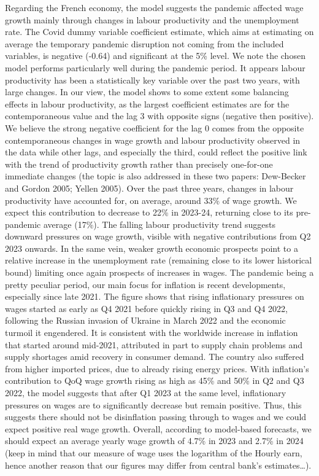 Regarding the French economy, the model suggests the pandemic affected wage growth mainly through changes in labour productivity and the unemployment rate. 
The Covid dummy variable coefficient estimate, which aims at estimating on average the temporary pandemic disruption not coming from the included variables, is negative (-0.64) and significant at the 5\% level. 
We note the chosen model performs particularly well during the pandemic period. 
It appears labour productivity has been a statistically key variable over the past two years, with large changes. 
In our view, the model shows to some extent some balancing effects in labour productivity, as the largest coefficient estimates are for the contemporaneous value and the lag 3 with opposite signs (negative then positive). 
We believe the strong negative coefficient for the lag 0 comes from the opposite contemporaneous changes in wage growth and labour productivity observed in the data while other lags, and especially the third, could reflect the positive link with the trend of productivity growth rather than precisely one-for-one immediate changes (the topic is also addressed in these two papers: Dew-Becker and Gordon 2005; Yellen 2005). 
Over the past three years, changes in labour productivity have accounted for, on average, around 33\% of wage growth. 
We expect this contribution to decrease to 22\% in 2023-24, returning close to its pre-pandemic average (17\%). 
The falling labour productivity trend suggests downward pressures on wage growth, visible with negative contributions from Q2 2023 onwards. 
\newpage
In the same vein, weaker growth economic prospects point to a relative increase in the unemployment rate (remaining close to its lower historical bound) limiting once again prospects of increases in wages. 
The pandemic being a pretty peculiar period, our main focus for inflation is recent developments, especially since late 2021. 
The figure shows that rising inflationary pressures on wages started as early as Q4 2021 before quickly rising in Q3 and Q4 2022, following the Russian invasion of Ukraine in March 2022 and the economic turmoil it engendered. 
It is consistent with the worldwide increase in inflation that started around mid-2021, attributed in part to supply chain problems and supply shortages amid recovery in consumer demand. 
The country also suffered from higher imported prices, due to already rising energy prices. 
With inflation’s contribution to QoQ wage growth rising as high as 45\% and 50\% in Q2 and Q3 2022, the model suggests that after Q1 2023 at the same level, inflationary pressures on wages are to significantly decrease but remain positive. 
Thus, this suggests there should not be disinflation passing through to wages and we could expect positive real wage growth. 
Overall, according to model-based forecasts, we should expect an average yearly wage growth of 4.7\% in 2023 and 2.7\% in 2024 (keep in mind that our measure of wage uses the logarithm of the Hourly earn, hence another reason that our figures may differ from central bank’s estimates…).

